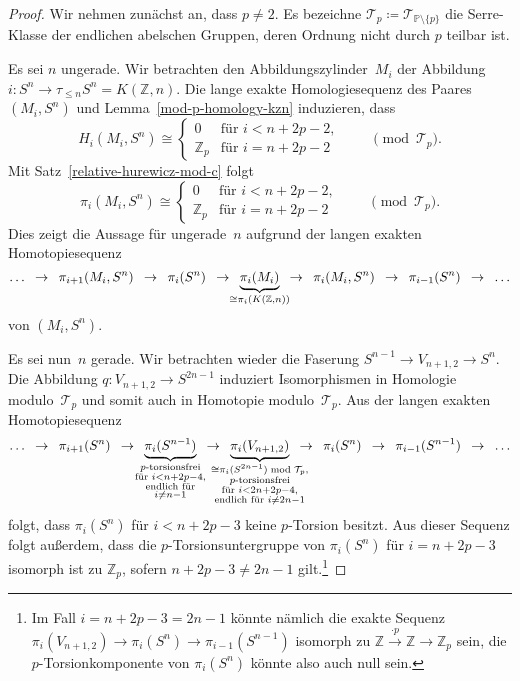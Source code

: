 \documentclass[11pt, a4paper, german]{article}
\theoremstyle{definition}
\theoremstyle{remark}
\newcommand{\R}{\mathbb{R}} %
\newcommand{\Z}{\mathbb{Z}} %
\newcommand{\T}{\mathcal{T}} %
\newcommand{\V}[2]{V_{{#2},{#1}}} %
\newcommand{\Primes}{\mathbb{P}} %
\begin{document}
\begin{proof}
  Wir nehmen zunächst an, dass $p \neq 2$.
  Es bezeichne $\T_p \coloneqq \T_{\Primes \setminus \{ p \}}$ die Serre-Klasse der endlichen abelschen Gruppen, deren Ordnung nicht durch $p$ teilbar ist.

  Es sei $n$ ungerade.
  Wir betrachten den Abbildungszylinder~$M_i$ der Abbildung $i : S^n \to \tau_{\leq n} S^n = K(\Z, n)$.
  Die lange exakte Homologiesequenz des Paares $(M_i, S^n)$ und Lemma~\ref{mod-p-homology-kzn} induzieren, dass
  \[
   H_i(M_i, S^n) \cong \begin{cases}
     0 & \text{für } i < n + 2p - 2, \\
     \Z_p & \text{für } i = n + 2p - 2
   \end{cases}
   \qquad \pmod{\T_p}.
  \]
  Mit Satz~\ref{relative-hurewicz-mod-c} folgt
  \[
   \pi_i(M_i, S^n) \cong \begin{cases}
     0 & \text{für } i < n + 2p - 2, \\
     \Z_p & \text{für } i = n + 2p - 2
   \end{cases}
   \qquad \pmod{\T_p}.
  \]
  Dies zeigt die Aussage für ungerade~$n$ aufgrund der langen exakten Homotopiesequenz
  \[
    \ldots
    \enspace\to\enspace
    \pi_{i+1}(M_i, S^n)
    \enspace\to\enspace
    \pi_i(S^n)
    \enspace\to\enspace
    \underbrace{\pi_i(M_i)}_{\mathclap{\cong \pi_i(K(\Z, n))}}
    \enspace\to\enspace
    \pi_i(M_i, S^n)
    \enspace\to\enspace
    \pi_{i-1}(S^n)
    \enspace\to\enspace
    \ldots
  \]
  von $(M_i, S^n)$.

  Es sei nun~$n$ gerade.
  Wir betrachten wieder die Faserung $S^{n-1} \to \V{2}{n+1} \to S^n$.
  Die Abbildung $q : \V{2}{n+1} \to S^{2n-1}$ induziert Isomorphismen in Homologie modulo~$\T_p$ und somit auch in Homotopie modulo~$\T_p$.
  Aus der langen exakten Homotopiesequenz
  \[
    \ldots
    \enspace\to\enspace
    \pi_{i+1}(S^n)
    \enspace\to\enspace
    \underbrace{\pi_i(S^{n-1})}_{\mathclap{\substack{\text{$p$-torsionsfrei} \\ \text{für } i < n + 2p - 4, \\ \text{endlich für} \\ i \neq n-1}}}
    \enspace\to\enspace
    \underbrace{\pi_i(\V{2}{n+1})}_{\mathclap{\substack{\cong \pi_i(S^{2n-1}) \bmod{\T_p}, \\ \text{$p$-torsionsfrei} \\ \text{für } i < 2n + 2p - 4, \\ \text{endlich für } i \neq 2n-1}}}
    \enspace\to\enspace
    \pi_i(S^n)
    \enspace\to\enspace
    \pi_{i-1}(S^{n-1})
    \enspace\to\enspace
    \ldots
  \]
  folgt, dass $\pi_i(S^n)$ für $i < n + 2p - 3$ keine $p$-Torsion besitzt.
  Aus dieser Sequenz folgt außerdem, dass die $p$-Torsionsuntergruppe von $\pi_i(S^n)$ für $i = n + 2p - 3$ isomorph ist zu $\Z_p$, sofern $n + 2p - 3 \neq 2n - 1$ gilt.\footnote{
    Im Fall $i = n + 2p - 3 = 2n - 1$ könnte nämlich die exakte Sequenz $\pi_i(\V{2}{n+1}) \to \pi_i(S^n) \to \pi_{i-1}(S^{n-1})$ isomorph zu $\Z \xrightarrow{\cdot p} \Z \to \Z_p$ sein, die $p$-Torsionkomponente von $\pi_i(S^n)$ könnte also auch null sein.
  }


\end{proof}
\end{document}
